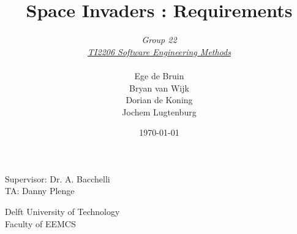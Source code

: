 \documentclass[10pt]{article}
\begin{document}
\title{Space Invaders : Requirements}
\date{\today}
\author{\textit{Group 22}\\ \textit{\underline{TI2206 Software Engineering Methods}} \\
 \\Ege de Bruin \\ Bryan van Wijk \\ Dorian de Koning \\ Jochem Lugtenburg }
 \maketitle  
 \begin{center}
Supervisor: Dr. A. Bacchelli\\
TA: Danny Plenge\\
 \end{center}     
 \begin{center}
 Delft University of Technology\\
 Faculty of EEMCS\\
 \end{center}
 \thispagestyle{empty}
 \pagebreak
 
 \tableofcontents
 
 \pagebreak

 






\end{document}
